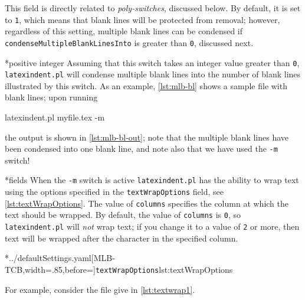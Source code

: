 	This field is directly related to \emph{poly-switches}, discussed below.
	By default, it is set to \texttt{1}, which means that blank lines will
	be protected from removal; however, regardless of this setting, multiple
	blank lines can be condensed if \texttt{condenseMultipleBlankLinesInto} is
	greater than \texttt{0}, discussed next.

*{positive integer}
	Assuming that this switch takes an integer value greater than \texttt{0}, \texttt{latexindent.pl} will condense multiple blank lines into
	the number of blank lines illustrated by this switch. As an example, \cref{lst:mlb-bl} shows a sample file
	with blank lines; upon running
	\begin{commandshell}
latexindent.pl myfile.tex -m  
\end{commandshell}
	the output is shown in \cref{lst:mlb-bl-out}; note that the multiple blank lines have been
	condensed into one blank line, and note also that we have used the \texttt{-m} switch!

	\begin{minipage}{.45\textwidth}
	\end{minipage}%
	\hfill
	\begin{minipage}{.45\textwidth}
	\end{minipage}

*{fields}
	When the \texttt{-m} switch is active \texttt{latexindent.pl} has the ability to wrap text using the options
	specified in the \texttt{textWrapOptions} field, see \cref{lst:textWrapOptions}. The value of
	\texttt{columns} specifies the column at which the text should be wrapped.
	By default, the value of \texttt{columns} is \texttt{0}, so \texttt{latexindent.pl}
	will \emph{not} wrap text; if you change it to a value of \texttt{2} or more, then
	text will be wrapped after the character in the specified column.

	\cmhlistingsfromfile[style=textWrapOptions]*{../defaultSettings.yaml}[MLB-TCB,width=.85\linewidth,before=\centering]{\texttt{textWrapOptions}}{lst:textWrapOptions}

	For example, consider the file give in \cref{lst:textwrap1}.

	\begin{widepage}
	\end{widepage}


